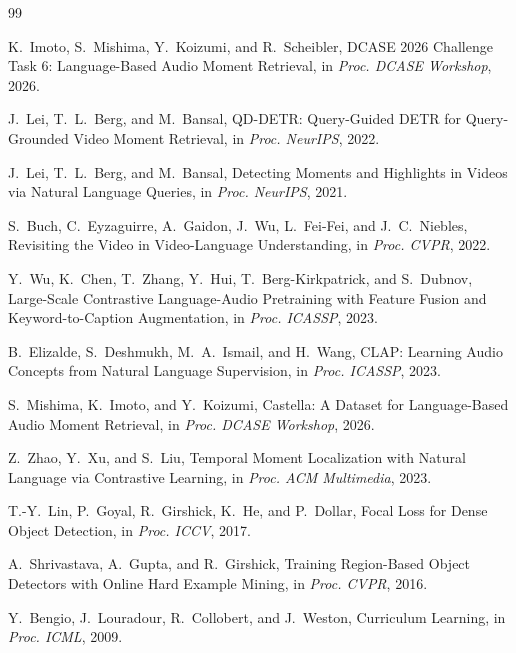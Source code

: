 \documentclass[conference]{IEEEtran}
\begin{document}

\begin{thebibliography}{99}

K.~Imoto, S.~Mishima, Y.~Koizumi, and R.~Scheibler,
DCASE 2026 Challenge Task 6: Language-Based Audio Moment Retrieval,
in \emph{Proc. DCASE Workshop}, 2026.

J.~Lei, T.~L.~Berg, and M.~Bansal,
QD-DETR: Query-Guided DETR for Query-Grounded Video Moment Retrieval,
in \emph{Proc. NeurIPS}, 2022.

J.~Lei, T.~L.~Berg, and M.~Bansal,
Detecting Moments and Highlights in Videos via Natural Language Queries,
in \emph{Proc. NeurIPS}, 2021.

S.~Buch, C.~Eyzaguirre, A.~Gaidon, J.~Wu, L.~Fei-Fei, and J.~C.~Niebles,
Revisiting the Video in Video-Language Understanding,
in \emph{Proc. CVPR}, 2022.

Y.~Wu, K.~Chen, T.~Zhang, Y.~Hui, T.~Berg-Kirkpatrick, and S.~Dubnov,
Large-Scale Contrastive Language-Audio Pretraining with Feature Fusion and
Keyword-to-Caption Augmentation,
in \emph{Proc. ICASSP}, 2023.

B.~Elizalde, S.~Deshmukh, M.~A.~Ismail, and H.~Wang,
CLAP: Learning Audio Concepts from Natural Language Supervision,
in \emph{Proc. ICASSP}, 2023.

S.~Mishima, K.~Imoto, and Y.~Koizumi,
Castella: A Dataset for Language-Based Audio Moment Retrieval,
in \emph{Proc. DCASE Workshop}, 2026.

Z.~Zhao, Y.~Xu, and S.~Liu,
Temporal Moment Localization with Natural Language via Contrastive Learning,
in \emph{Proc. ACM Multimedia}, 2023.

T.-Y.~Lin, P.~Goyal, R.~Girshick, K.~He, and P.~Dollar,
Focal Loss for Dense Object Detection,
in \emph{Proc. ICCV}, 2017.

A.~Shrivastava, A.~Gupta, and R.~Girshick,
Training Region-Based Object Detectors with Online Hard Example Mining,
in \emph{Proc. CVPR}, 2016.

Y.~Bengio, J.~Louradour, R.~Collobert, and J.~Weston,
Curriculum Learning,
in \emph{Proc. ICML}, 2009.

\end{thebibliography}
\end{document}
